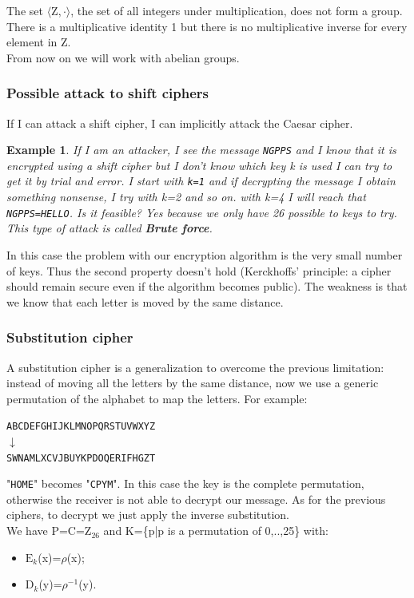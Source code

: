 \documentclass[a4paper, 12pt]{report}
\newtheorem{example}{\textbf{Example}}
\begin{document}
\vspace{5mm}
The set $\langle\textrm{Z},\cdot\rangle$, the set of all integers under multiplication, does not form a group. There is a multiplicative identity 1 but there is no multiplicative inverse for every element in Z.\\

From now on we will work with abelian groups.

\subsubsection{Possible attack to shift ciphers}
If I can attack a shift cipher, I can implicitly attack the Caesar cipher.
\begin{example}
	If I am an attacker, I see the message \texttt{NGPPS} and I know that it is encrypted using a shift cipher but I don't know which key k is used I can try to get it by trial and error. I start with \texttt{k=1} and if decrypting the message I obtain something nonsense, I try with k=2 and so on. with k=4 I will reach that \texttt{NGPPS=HELLO}. Is it feasible? Yes because we only have 26 possible to keys to try. This type of attack is called \textbf{Brute force}.
\end{example}

In this case the problem with our encryption algorithm is the very small number of keys. Thus the second property doesn't hold (Kerckhoffs' principle: a cipher should remain secure even if the algorithm becomes public). The weakness is that we know that each letter is moved by the same distance.

\subsubsection{Substitution cipher}
A substitution cipher is a generalization to overcome the previous limitation: instead of moving all the letters by the same distance, now we use a generic permutation of the alphabet to map the letters. For example:
\begin{center}
	\texttt{ABCDEFGHIJKLMNOPQRSTUVWXYZ}\\
	$\downarrow$\\
	\texttt{SWNAMLXCVJBUYKPDOQERIFHGZT}
\end{center}
"\texttt{HOME}" becomes "\texttt{CPYM}". In this case the key is the complete permutation, otherwise the receiver is not able to decrypt our message. As for the previous ciphers, to decrypt we just apply the inverse substitution.\\
We have P=C=$\textrm{Z}_{26}$ and K=\{p|p is a permutation of 0,..,25\} with:
\begin{itemize}
	\item $\textrm{E}_k$(x)=$\rho$(x);
	\item $\textrm{D}_k$(y)=$\rho^{-1}$(y).
\end{itemize}
\end{document}
